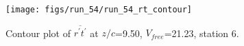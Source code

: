 \begin{figure}[H]
\centering
\texttt{[image: figs/run\_54/run\_54\_rt\_contour]}
\caption{Contour plot of $\overline{r^\prime t^\prime}$ at $z/c$=9.50, $V_{free}$=21.23, station 6.}
\label{fig:run_54_rt_contour}
\end{figure}


